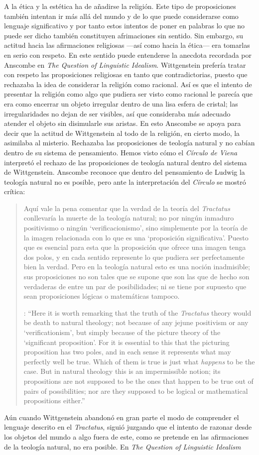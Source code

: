 A la ética y la estética ha de añadirse la religión. Este tipo de proposiciones también intentan ir más allá del mundo y de lo que puede considerarse como lenguaje significativo y por tanto estos intentos de poner en palabras lo que no puede ser dicho también constituyen afrimaciones sin sentido. Sin embargo, su actitud hacia las afirmaciones religiosas ---así como hacia la ética--- era tomarlas en serio con respeto. En este sentido puede entenderse la anecdota recordada por Anscombe en \emph{The Question of Linguistic Idealism}. Wittgenstein prefería tratar con respeto las proposiciones religiosas en tanto que contradictorias, puesto que rechazaba la idea de considerar la religión como racional. Así es que el intento de presentar la religión como algo que pudiera ser visto como racional le parecía que era como encerrar un objeto irregular dentro de una lisa esfera de cristal; las irregularidades no dejan de ser visibles, así que consideraba más adecuado atender el objeto sin disimularle sus aristas. En esto Anscombe se apoya para decir que la  actitud de Wittgenstein al todo de la religión, en cierto modo, la asimilaba al misterio. Rechazaba las proposiciones de teología natural y no cabían dentro de su sistema de pensamiento. Hemos visto cómo el \emph{Círculo de Viena} interpretó el rechazo de las proposiciones de teología natural dentro del sistema de Wittgenstein. Anscombe reconoce que dentro del pensamiento de Ludwig la teología natural no es posible, pero ante la interpretación del \emph{Círculo} se mostró crítica:\blockquote[{\cite[78]{anscombe1959iwt}}: \enquote{Here it is worth remarking that the truth of the \emph{Tractatus} theory would be death to natural theology; not because of any jejune positivism or any `verificationism', but simply because of the picture theory of the `significant proposition'. For it is essential to this that the picturing proposition has two poles, and in each sense it represents what may perfectly well be true. Which of them is true is just what \emph{happens} to be the case. But in natural theology this is an impermissible notion; its propositions are not supposed to be the ones that happen to be true out of pairs of possibilities; nor are they supposed to be logical or mathematical propositions either.}]{Aquí vale la pena comentar que la verdad de la teoría del \emph{Tractatus} conllevaría la muerte de la teología natural; no por ningún inmaduro positivismo o ningún `verificacionismo', sino simplemente por la teoría de la imagen relacionada con lo que es una `proposición significativa'. Puesto que es esencial para esta que la proposición que ofrece una imagen tenga dos polos, y en cada sentido represente lo que pudiera ser perfectamente bien la verdad. Pero en la teología natural esto es una noción inadmisible; sus proposiciones no son tales que se supone que son las que de hecho son verdaderas de entre un par de posibilidades; ni se tiene por supuesto que sean proposiciones lógicas o matemáticas tampoco.} Aún cuando Wittgenstein abandonó en gran parte el modo de comprender el lenguaje descrito en el \emph{Tractatus}, siguió juzgando que el intento de razonar desde los objetos del mundo a algo fuera de este, como se pretende en las afirmaciones de la teología natural, no era posible. En \emph{The Question of Linguistic Idealism} 